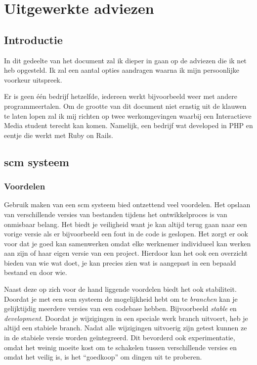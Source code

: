 \chapter{Uitgewerkte adviezen}

\section{Introductie}

In dit gedeelte van het document zal ik dieper in gaan op de adviezen die ik net heb opgesteld. Ik zal een aantal opties aandragen waarna ik mijn persoonlijke voorkeur uitspreek.

Er is geen \'{e}\'{e}n bedrijf hetzelfde, iedereen werkt bijvoorbeeld weer met andere programmeertalen. Om de grootte van dit document niet ernstig uit de klauwen te laten lopen zal ik mij richten op twee werkomgevingen waarbij een Interactieve Media student terecht kan komen. Namelijk, een bedrijf wat developed in PHP en eentje die werkt met Ruby on Rails.

\section{{\sc scm} systeem}

\subsection{Voordelen}

Gebruik maken van een {\sc scm} systeem bied ontzettend veel voordelen. Het opslaan van verschillende versies van bestanden tijdens het ontwikkelproces is van onmisbaar belang. Het biedt je veiligheid want je kan altijd terug gaan naar een vorige versie als er bijvoorbeeld een fout in de code is geslopen. Het zorgt er ook voor dat je goed kan samenwerken omdat elke werknemer individueel kan werken aan zijn of haar eigen versie van een project. Hierdoor kan het ook een overzicht bieden van wie wat doet, je kan precies zien wat is aangepast in een bepaald bestand en door wie.

Naast deze op zich voor de hand liggende voordelen biedt het ook stabiliteit. Doordat je met een {\sc scm} systeem de mogelijkheid hebt om te \emph{branchen} kan je gelijktijdig meerdere versies van een codebase hebben. Bijvoorbeeld \emph{stable} en \emph{development}. Doordat je wijzigingen in een speciale werk branch uitvoert, heb je altijd een stabiele branch. Nadat alle wijzigingen uitvoerig zijn getest kunnen ze in de stabiele versie worden ge\"{i}ntegreerd. Dit bevorderd ook experimentatie, omdat het weinig moeite kost om te schakelen tussen verschillende versies en omdat het veilig is, is het ``goedkoop'' om dingen uit te proberen.

